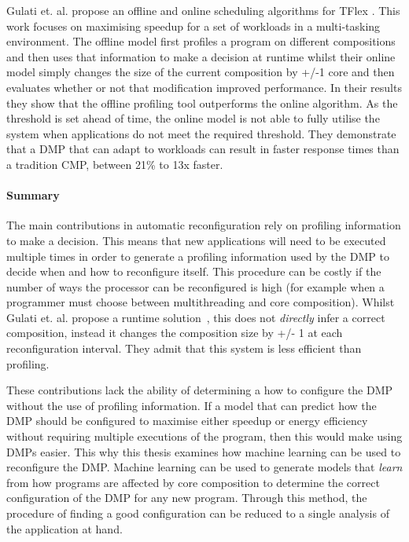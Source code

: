 Gulati et. al. propose an offline and online scheduling algorithms for TFlex \cite{gulati2008multitaskingdmc}. 
This work focuses on maximising speedup for a set of workloads in a multi-tasking environment.
The offline model first profiles a program on different compositions and then uses that information to make a decision at runtime whilst their online model simply changes the size of the current composition by +/-1 core and then evaluates whether or not that modification improved performance.
In their results they show that the offline profiling tool outperforms the online algorithm.
As the threshold is set ahead of time, the online model is not able to fully utilise the system when applications do not meet the required threshold.
They demonstrate that a DMP that can adapt to workloads can result in faster response times than a tradition CMP, between 21\% to 13x faster.

\paragraph*{Summary}
The main contributions in automatic reconfiguration rely on profiling information to make a decision.
This means that new applications will need to be executed multiple times in order to generate a profiling information used by the DMP to decide when and how to reconfigure itself.
This procedure can be costly if the number of ways the processor can be reconfigured is high (for example when a programmer must choose between multithreading and core composition).
Whilst Gulati et. al. propose a runtime solution~\cite{gulati2008multitaskingdmc}, this does not \textit{directly} infer a correct composition, instead it changes the composition size by +/- 1 at each reconfiguration interval.
They admit that this system is less efficient than profiling.

These contributions lack the ability of determining a how to configure the DMP without the use of profiling information.
If a model that can predict how the DMP should be configured to maximise either speedup or energy efficiency without requiring multiple executions of the program, then this would make using DMPs easier.
This why this thesis examines how machine learning can be used to reconfigure the DMP.
Machine learning can be used to generate models that \textit{learn} from how programs are affected by core composition to determine the correct configuration of the DMP for any new program.
Through this method, the procedure of finding a good configuration can be reduced to a single analysis of the application at hand.

